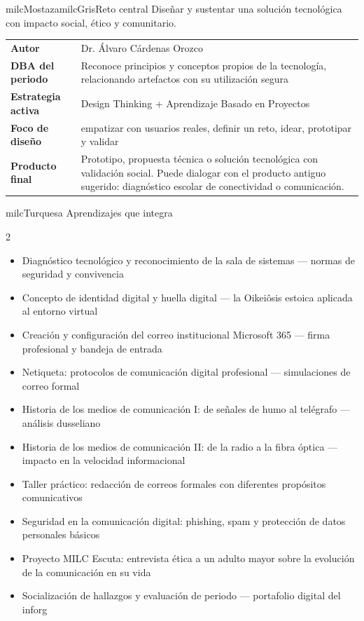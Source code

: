 \documentclass[11pt,letterpaper]{article}
\begin{document}
\begin{softbox}{milcMostaza}{milcGris}{Reto central}
Diseñar y sustentar una solución tecnológica con impacto social, ético y comunitario.
\end{softbox}

\begin{tabularx}{\textwidth}{>{\bfseries}p{3.4cm}X}
\rowcolor{milcMagenta!12}Autor & Dr. Álvaro Cárdenas Orozco\\
DBA del periodo & Reconoce principios y conceptos propios de la tecnología, relacionando artefactos con su utilización segura\\
Estrategia activa & Design Thinking + Aprendizaje Basado en Proyectos\\
Foco de diseño & empatizar con usuarios reales, definir un reto, idear, prototipar y validar\\
Producto final & Prototipo, propuesta técnica o solución tecnológica con validación social. Puede dialogar con el producto antiguo sugerido: diagnóstico escolar de conectividad o comunicación.\\
\end{tabularx}

\begin{titlebox}{milcTurquesa}
Aprendizajes que integra
\end{titlebox}
\begin{multicols}{2}
\begin{itemize}[leftmargin=*]
\item Diagnóstico tecnológico y reconocimiento de la sala de sistemas — normas de seguridad y convivencia
\item Concepto de identidad digital y huella digital — la Oikeiôsis estoica aplicada al entorno virtual
\item Creación y configuración del correo institucional Microsoft 365 — firma profesional y bandeja de entrada
\item Netiqueta: protocolos de comunicación digital profesional — simulaciones de correo formal
\item Historia de los medios de comunicación I: de señales de humo al telégrafo — análisis dusseliano
\item Historia de los medios de comunicación II: de la radio a la fibra óptica — impacto en la velocidad informacional
\item Taller práctico: redacción de correos formales con diferentes propósitos comunicativos
\item Seguridad en la comunicación digital: phishing, spam y protección de datos personales básicos
\item Proyecto MILC Escuta: entrevista ética a un adulto mayor sobre la evolución de la comunicación en su vida
\item Socialización de hallazgos y evaluación de periodo — portafolio digital del inforg
\end{itemize}
\end{multicols}
\end{document}
